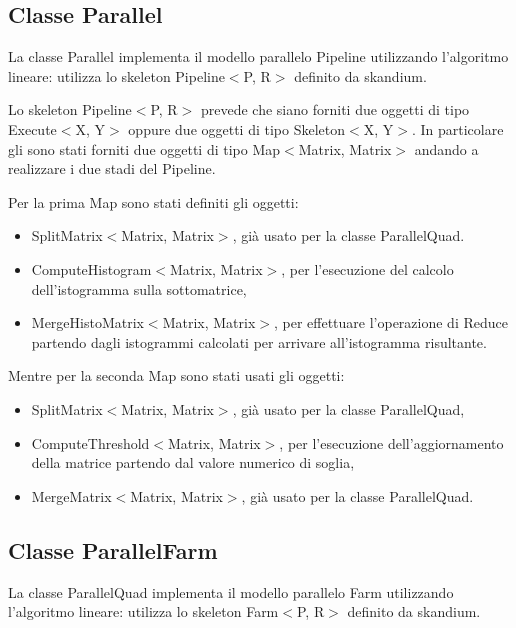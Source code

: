 \documentclass[a4paper,10pt]{article}
\begin{document}
\subsection{Classe \textsf{Parallel}}
\label{c:par}

La classe \textsf{Parallel} implementa il modello parallelo \textsf{Pipeline} utilizzando l'algoritmo lineare: utilizza lo skeleton \textsf{Pipeline$<$P, R$>$} definito da skandium.

Lo skeleton \textsf{Pipeline$<$P, R$>$} prevede che siano forniti due oggetti di tipo \textsf{Execute$<$X, Y$>$} oppure due oggetti di tipo \textsf{Skeleton$<$X, Y$>$}. In particolare gli sono stati forniti due oggetti di tipo \textsf{Map$<$Matrix, Matrix$>$} andando a realizzare i due stadi del \textsf{Pipeline}.

Per la prima \textsf{Map} sono stati definiti gli oggetti:
\begin{itemize}
\item \textsf{SplitMatrix$<$Matrix, Matrix$>$}, gi\`a usato per la classe \textsf{ParallelQuad}.
\item \textsf{ComputeHistogram$<$Matrix, Matrix$>$}, per l'esecuzione del calcolo dell'istogramma sulla sottomatrice,
\item \textsf{MergeHistoMatrix$<$Matrix, Matrix$>$}, per effettuare l'operazione di \textsf{Reduce} partendo dagli istogrammi calcolati per arrivare all'istogramma risultante.
\end{itemize}


Mentre per la seconda \textsf{Map} sono stati usati gli oggetti:
\begin{itemize}
\item \textsf{SplitMatrix$<$Matrix, Matrix$>$}, gi\`a usato per la classe \textsf{ParallelQuad}, 
\item \textsf{ComputeThreshold$<$Matrix, Matrix$>$}, per l'esecuzione dell'aggiornamento della matrice partendo dal valore numerico di soglia,
\item \textsf{MergeMatrix$<$Matrix, Matrix$>$}, gi\`a usato per la classe \textsf{ParallelQuad}.
\end{itemize}

\subsection{Classe \textsf{ParallelFarm}}
\label{c:parfarm}

La classe \textsf{ParallelQuad} implementa il modello parallelo \textsf{Farm} utilizzando l'algoritmo lineare: utilizza lo skeleton \textsf{Farm$<$P, R$>$} definito da skandium.
\end{document}
